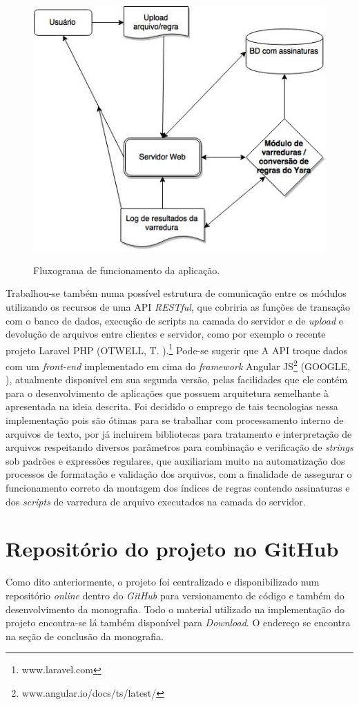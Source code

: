 \begin{figure}[H]
  \caption{Fluxograma de funcionamento da aplicação.}
  \includegraphics[scale=0.6]{figs/flux_prototipo}
  \centering
  \label{f.flux_prototipo}
\end{figure}

Trabalhou-se também numa possível estrutura de comunicação entre os módulos
utilizando os recursos de uma API \textit{RESTful}, que cobriria as funções de
transação com o banco de dados, execução de scripts na camada do servidor e de
\textit{upload} e devolução de arquivos entre clientes e servidor, como por
exemplo o recente projeto Laravel PHP (OTWELL, T. \citeyear{laravel}).\footnote{www.laravel.com} Pode-se sugerir que A API troque dados
com um \textit{front-end} implementado em cima do \textit{framework} Angular JS\footnote{www.angular.io/docs/ts/latest/} (GOOGLE, \citeyear{angularjs}),
atualmente disponível em sua segunda versão, pelas facilidades que ele contém
para o desenvolvimento de aplicações que possuem arquitetura semelhante à
apresentada na ideia descrita. Foi decidido o emprego de tais tecnologias nessa
implementação pois são ótimas para se trabalhar com processamento interno de
arquivos de texto, por já incluirem bibliotecas para tratamento e interpretação
de arquivos respeitando diversos parâmetros para combinação e verificação de
\textit{strings} sob padrões e expressões regulares, que auxiliariam muito na
automatização dos processos de formatação e validação dos arquivos, com a
finalidade de assegurar o funcionamento correto da montagem dos índices de
regras contendo assinaturas e dos \textit{scripts} de varredura de arquivo
executados na camada do servidor.

\section{Repositório do projeto no GitHub}
\label{s.repositorio}
Como dito anteriormente, o projeto foi centralizado e disponibilizado num
repositório \textit{online} dentro do \textit{GitHub} para versionamento de
código e também do desenvolvimento da monografia. Todo o material utilizado na
implementação do projeto encontra-se lá também disponível para
\textit{Download}. O endereço se encontra na seção de conclusão da monografia.
